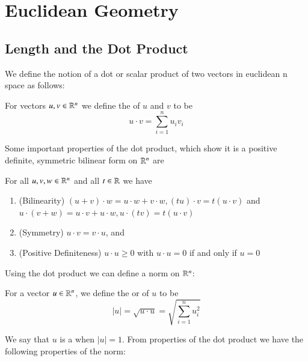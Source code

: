 \documentclass[12pt, a4paper, oneside, openright, titlepage]{book}
\begin{document}
\tableofcontents


\part{Euclidean Geometry}

\chapter{Length and the Dot Product}

We define the notion of a dot or scalar product of two vectors in euclidean n space as follows: 

\begin{defn}
    For vectors $u,v \in \mathbb R^n$ we define the  of $u$ and $v$ to be \begin{equation*}
        u\cdot v = \sum_{i=1}^nu_iv_i
    \end{equation*}
\end{defn}
Some important properties of the dot product, which show it is a positive definite, symmetric bilinear form on $\mathbb R^n$ are 

\begin{thm}
    For all $u,v,w \in \mathbb R^n$ and all $t \in \mathbb R$ we have \begin{enumerate}
        \item (Bilinearity) $(u+v)\cdot w = u\cdot w + v\cdot w, (tu)\cdot v = t(u\cdot v)$ and $u\cdot (v+w) = u\cdot v + u\cdot w, u \cdot (tv) = t(u\cdot v)$
        \item (Symmetry) $u\cdot v = v\cdot u$, and 
        \item (Positive Definiteness) $u\cdot u \geq 0$ with $u \cdot u = 0$ if and only if $u = 0$
    \end{enumerate}
\end{thm}

Using the dot product we can define a norm on $\mathbb R^n$:

\begin{defn}
    For a vector $u \in \mathbb R^n$, we define the  or  of $u$ to be \begin{equation*}
        |u| = \sqrt{u\cdot u} = \sqrt{\sum_{i=1}^nu_i^2}
    \end{equation*}
\end{defn}

We say that $u$ is a  when $|u| = 1$. From properties of the dot product we have the following properties of the norm:
\end{document}

